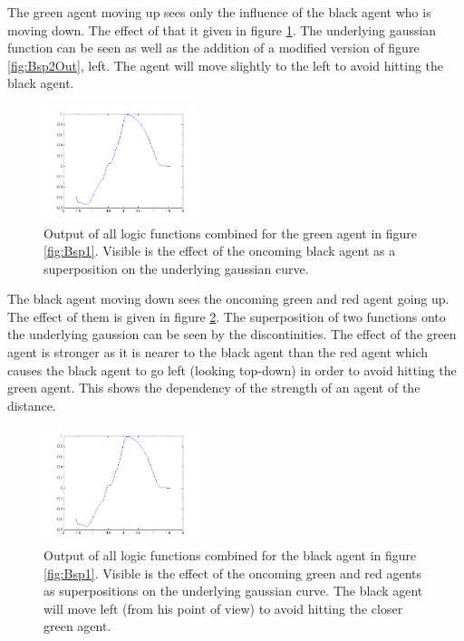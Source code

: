 \noi The green agent moving up sees only the influence of the black agent who is moving down. The effect of that it given in figure \ref{fig:Bsp1Mitte}. The underlying gaussian function can be seen as well as the addition of a modified version of figure \ref{fig:Bsp2Out}, left. The agent will move slightly to the left to avoid hitting the black agent.\\
\begin{figure}[h!]
	\centering
		\includegraphics[width=0.40\textwidth]{pictures/Bsp1LinksUnten}
	\caption{Output of all logic functions combined for the green agent in figure \ref{fig:Bsp1}. Visible is the effect of the oncoming black agent as a superposition on the underlying gaussian curve.}
	\label{fig:Bsp1Mitte}
\end{figure}

\noi The black agent moving down sees the oncoming green and red agent going up. The effect of them is given in figure \ref{fig:Bsp1ObenRechts}. The superposition of two functions onto the underlying gaussion can be seen by the discontinities. The effect of the green agent is stronger as it is nearer to the black agent than the red agent which causes the black agent to go left (looking top-down) in order to avoid hitting the green agent. This shows the dependency of the strength of an agent of the distance.
\begin{figure}[h!]
	\centering
		\includegraphics[width=0.40\textwidth]{pictures/Bsp1LinksUnten}
	\caption{Output of all logic functions combined for the black agent in figure \ref{fig:Bsp1}. Visible is the effect of the oncoming green and red agents as superpositions on the underlying gaussian curve. The black agent will move left (from his point of view) to avoid hitting the closer green agent.}
	\label{fig:Bsp1ObenRechts}
\end{figure}



